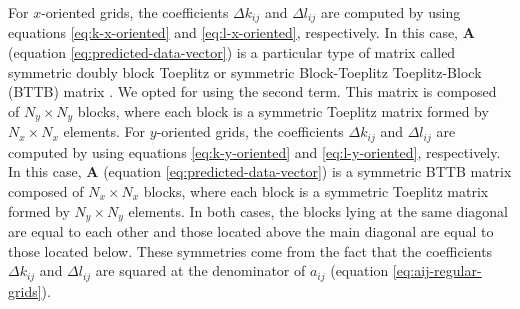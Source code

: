 \documentclass[manuscript,revised]{geophysics}
\begin{document}
For $x$-oriented grids, the coefficients $\Delta k_{ij}$ and $\Delta l_{ij}$ are 
computed by using equations \ref{eq:k-x-oriented} and \ref{eq:l-x-oriented}, respectively.
In this case, $\mathbf{A}$ (equation \ref{eq:predicted-data-vector}) is a 
particular type of matrix called symmetric doubly block Toeplitz \citep[][ p. 28]{jain1989}
or symmetric Block-Toeplitz Toeplitz-Block (BTTB) matrix \citep[][ p. 67]{chan-jin2007}.
We opted for using the second term. This matrix is 
composed of $N_{y} \times N_{y}$ blocks, where each block is a symmetric Toeplitz matrix
formed by $N_{x} \times N_{x}$ elements.
For $y$-oriented grids, the coefficients $\Delta k_{ij}$ and $\Delta l_{ij}$ are 
computed by using equations \ref{eq:k-y-oriented} and \ref{eq:l-y-oriented}, respectively.
In this case, $\mathbf{A}$ (equation \ref{eq:predicted-data-vector}) is a 
symmetric BTTB matrix composed of $N_{x} \times N_{x}$ blocks, where each block is a
symmetric Toeplitz matrix formed by $N_{y} \times N_{y}$ elements.
In both cases, the blocks lying at the same diagonal are equal to each other
and those located above the main diagonal are equal to those located below.
These symmetries come from the fact that the coefficients
$\Delta k_{ij}$ and $\Delta l_{ij}$ are squared at the denominator of 
$a_{ij}$ (equation \ref{eq:aij-regular-grids}).
\end{document}
